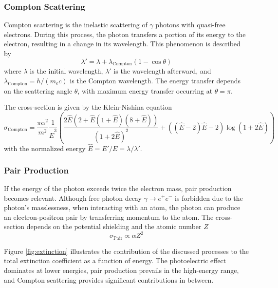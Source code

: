 \subsubsection*{Compton Scattering}
Compton scattering is the inelastic scattering of $\gamma$ photons 
with quasi-free electrons. During this process, the photon transfers 
a portion of its energy to the electron, resulting in a change in its 
wavelength. This phenomenon is described by
\begin{equation}
    \lambda'=\lambda+\lambda_\text{Compton}(1-\cos{\theta})
\end{equation}
where $\lambda$ is the initial wavelength, $\lambda'$ is the wavelength 
afterward, and $\lambda_\text{Compton} = h/(m_ec)$ is the Compton 
wavelength. The energy transfer depends on the scattering angle 
$\theta$, with maximum energy transfer occurring at $\theta = \pi$.
 
\noindent
The cross-section is given by the Klein-Nishina equation
\begin{equation}
    \sigma_\text{Compton}=\frac{\pi\alpha^2}{m^2}\frac{1}{\hat{E}^3}\left(\frac{2\hat{E}(2+\hat{E}(1+\hat{E})(8+\hat{E}))}{(1+2\hat{E})^2}+((\hat{E}-2)\hat{E}-2)\log(1+2\hat{E})\right)
\end{equation}
with the normalized energy $\hat{E} = E'/E = \lambda/\lambda'$.

\subsubsection{Pair Production}
If the energy of the photon exceeds twice the electron mass, pair 
production becomes relevant. Although free photon decay 
$\gamma\to e^+e^-$ is forbidden due to the photon's masslessness, 
when interacting with an atom, the photon can produce an 
electron-positron pair by transferring momentum to the atom. 
The cross-section depends on the potential shielding and the atomic 
number $Z$
\begin{equation}
    \sigma_\text{Pair}\propto \alpha Z^2
\end{equation}

\noindent
Figure \ref{fig:extinction} illustrates the contribution of the 
discussed processes to the total extinction coefficient as a function 
of energy. The photoelectric effect dominates at lower energies, pair 
production prevails in the high-energy range, and Compton scattering 
provides significant contributions in between.

